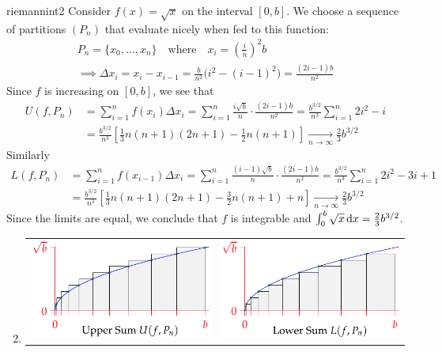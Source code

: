 \begin{examples}{}{riemannint2}
	\exstart Consider $f(x)=\sqrt x$ on the interval $[0,b]$. We choose a sequence of partitions $(P_n)$ that evaluate nicely when fed to this function:
	\begin{gather*}
	  P_n=\{x_0,\ldots,x_n\}\quad\text{where}\quad x_i=\left(\frac in\right)^2b\\
	  \implies \Delta x_i=x_i-x_{i-1}=\frac b{n^2}\bigl(i^2-(i-1)^2\bigr)=\frac{(2i-1)b}{n^2}
	\end{gather*}
	Since $f$ is increasing on $[0,b]$, we see that
	\begin{align*}
	  U(f,P_n)
	  &=\sum_{i=1}^nf(x_i)\Delta x_i 
	  	=\sum_{i=1}^n\frac{i\sqrt b}n\cdot\frac{(2i-1)b}{n^2} 
	  	=\frac{b^{3/2}}{n^3}\sum_{i=1}^n2i^2-i \\
	  &=\frac{b^{3/2}}{n^3}\left[\frac 13n(n+1)(2n+1)-\frac 12n(n+1)\right] 
	  	\xrightarrow[n\to\infty]{}\frac 23b^{3/2}
	\end{align*}
	Similarly
	\begin{align*}
	  L(f,P_n)
	  &=\sum_{i=1}^nf(x_{i-1})\Delta x_i 
	  	=\sum_{i=1}^n\frac{(i-1)\sqrt b}n\cdot\frac{(2i-1)b}{n^2} 
	  	=\frac{b^{3/2}}{n^3}\sum_{i=1}^n2i^2-3i+1 \\
	  &=\frac{b^{3/2}}{n^3}\left[\frac 13n(n+1)(2n+1)-\frac 32n(n+1) +n\right] 
	  	\xrightarrow[n\to\infty]{}\frac 23b^{3/2}
	\end{align*}
	Since the limits are equal, we conclude that $f$ is integrable and $\int_0^b\sqrt x\,{\mathrm{d} x}=\frac 23b^{3/2}$.
	
	\begin{enumerate}\setcounter{enumi}{1}
	  \item[]\begin{center}
		  \begin{tabular}{c@{\qquad}c}
		  	\includegraphics[scale=0.95]{darboux-ex1}
		  	&
		  	\includegraphics[scale=0.95]{darboux-ex2}
	  	\end{tabular}
	  \end{center}
	  

\end{enumerate}
\end{examples}
